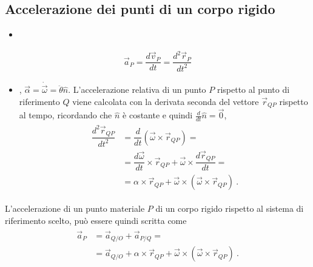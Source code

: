 \documentclass[letterpaper,10pt,italian]{jupyterBook}
\begin{document}
\subsection{Accelerazione dei punti di un corpo rigido}
\label{\detokenize{ch/mechanics/kinematics-rigid:accelerazione-dei-punti-di-un-corpo-rigido}}\begin{itemize}
\item {} 
\sphinxAtStartPar
{}

\end{itemize}
\begin{equation*}
\begin{split}\vec{a}_P = \dfrac{d \vec{v}_P}{dt} = \dfrac{d^2 \vec{r}_P}{d t^2}\end{split}
\end{equation*}\begin{itemize}
\item {} 
\sphinxAtStartPar
{}, \(\vec{\alpha} = \dot{\vec{\omega}} = \ddot{\theta} \hat{n}\). L’accelerazione relativa di un punto \(P\) rispetto al punto di riferimento \(Q\) viene calcolata con la derivata seconda del vettore \(\vec{r}_{QP}\) rispetto al tempo, ricordando che \(\hat{n}\) è costante e quindi \(\frac{d}{dt} \hat{n} = \vec{0}\),
\begin{equation*}
\begin{split}\begin{aligned}
   \dfrac{d^2 \vec{r}_{QP}}{dt^2}
     & = \dfrac{d}{dt} \left( \vec{\omega} \times \vec{r}_{QP} \right) = \\
     & = \dfrac{d \vec{\omega}}{dt} \times \vec{r}_{QP} + \vec{\omega} \times \dfrac{d \vec{r}_{QP}}{dt}= \\
     & = \alpha \times \vec{r}_{QP} + \vec{\omega} \times \left( \vec{\omega} \times \vec{r}_{QP} \right) \ .
  \end{aligned}\end{split}
\end{equation*}
\end{itemize}

\sphinxAtStartPar
L’accelerazione di un punto materiale \(P\) di un corpo rigido rispetto al sistema di riferimento scelto, può essere quindi scritta come
\begin{equation*}
\begin{split}\begin{aligned}
    \vec{a}_P & = \vec{a}_{Q/O} + \vec{a}_{P/Q} = \\
              & = \vec{a}_{Q/O} + \alpha \times \vec{r}_{QP} + \vec{\omega} \times \left( \vec{\omega} \times \vec{r}_{QP} \right) \ .
  \end{aligned}\end{split}
\end{equation*}
\sphinxstepscope
\end{document}
